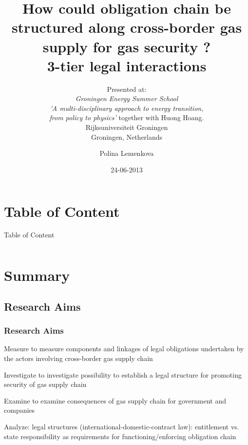 \documentclass[pdflatex,compress,10pt,
	xcolor={dvipsnames,dvipsnames,svgnames,x11names,table},
	hyperref={
	colorlinks = true,
	breaklinks = true, 
	citecolor=NavyBlue, 
	urlcolor = blue, 
	filecolor=magenta} 
]{beamer}
\date{24-06-2013}
\title[\textcolor{white}{How could obligation chain be structured along cross-border gas supply ? Groningen, Netherlands, 24-06-2013}]{\textcolor{DodgerBlue4}{How could obligation chain be structured along cross-border gas supply for gas security ? \\3-tier legal interactions}}
\subtitle{\textcolor{Cyan4}{Presented at: \\
\large{\emph{Groningen Energy Summer School \\
'A multi-disciplinary approach to energy transition,\\ from policy to physics'}}
\normalsize{together with Huong Hoang. \\
Rijksuniversiteit Groningen\\
Groningen, Netherlands}}}
\author[\textcolor{Sienna3}{Polina Lemenkova}]{\large{Polina Lemenkova}}
\begin{document}
\begin{frame}
           \titlepage
\end{frame}

\section*{Table of Content}
\begin{frame}{Table of Content}
    \begin{columns}[onlytextwidth,T]
        \begin{column}{.5\textwidth}
            \tiny{\tableofcontents[sections=1-8]}
        \end{column}
        \begin{column}{.5\textwidth}
            \tiny{\tableofcontents[sections=9-14]}
        \end{column}
    \end{columns}
\end{frame}


\section{Summary}
\subsection{Research Aims}
\begin{frame}\frametitle{Research Aims}

\begin{alertblock}{Measure}
to measure components and linkages of legal obligations undertaken by the actors involving cross-border gas supply chain
\end{alertblock}

\begin{block}{Investigate}
to investigate possibility to establish a legal structure for promoting security of gas supply chain
\end{block}

\begin{block}{Examine}
to examine consequences of gas supply chain for government and companies
\end{block}

\begin{examples}{Analyze:}
legal structures (international-domestic-contract law): entitlement vs. state responsibility as requirements for functioning/enforcing obligation chain
\end{examples}

\end{frame}
\end{document}
